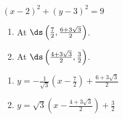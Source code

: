 {$(x-2)^2+(y-3)^2=9$
\begin{enumerate}
\item	At $\ds \left(\frac72,\frac{6+3\sqrt{3}}{2}\right)$.
\item	At $\ds\left(\frac{4+3\sqrt{3}}{2}, \frac32\right)$.
\end{enumerate}
}
{\begin{enumerate}
\item	$y=-\frac{1}{\sqrt{3}}(x-\frac72)+\frac{6+3\sqrt{3}}{2}$
\item	$y = \sqrt{3}(x-\frac{4+3\sqrt{3}}2)+\frac32$
\end{enumerate}
}
